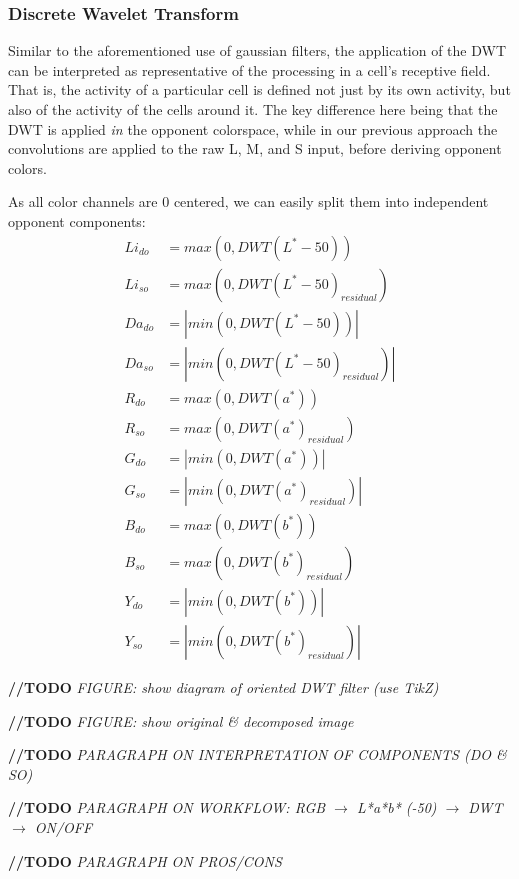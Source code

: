 \documentclass[journal,onecolumn]{IEEEtran}
\begin{document}
\subsubsection*{Discrete Wavelet Transform}
Similar to the aforementioned use of gaussian filters, the application of the DWT can be interpreted as representative of the processing in a cell's receptive field. That is, the activity of a particular cell is defined not just by its own activity, but also of the activity of the cells around it. The key difference here being that the DWT is applied \textit{in} the opponent colorspace, while in our previous approach the convolutions are applied to the raw L, M, and S input, before deriving opponent colors.

As all color channels are $0$ centered, we can easily split them into independent opponent components:
\begin{align}
    Li_{do} &=   max(0, DWT(L^*-50))              \\
    Li_{so} &=   max(0, DWT(L^*-50)_{residual})   \\
    Da_{do} &= | min(0, DWT(L^*-50)) |            \\
    Da_{so} &= | min(0, DWT(L^*-50)_{residual}) | \\
    R_{do}  &=   max(0, DWT(a^*))              \\
    R_{so}  &=   max(0, DWT(a^*)_{residual})   \\
    G_{do}  &= | min(0, DWT(a^*)) |            \\
    G_{so}  &= | min(0, DWT(a^*)_{residual}) | \\
    B_{do}  &=   max(0, DWT(b^*))              \\
    B_{so}  &=   max(0, DWT(b^*)_{residual})   \\
    Y_{do}  &= | min(0, DWT(b^*)) |            \\
    Y_{so}  &= | min(0, DWT(b^*)_{residual}) |
\end{align}

\textbf{//TODO} \textit{FIGURE: show diagram of oriented DWT filter (use TikZ)}

\textbf{//TODO} \textit{FIGURE: show original \& decomposed image}

\textbf{//TODO} \textit{PARAGRAPH ON INTERPRETATION OF COMPONENTS (DO \& SO)}

\textbf{//TODO} \textit{PARAGRAPH ON WORKFLOW: RGB $\rightarrow$ L*a*b* (-50) $\rightarrow$ DWT $\rightarrow$ ON/OFF}

\textbf{//TODO} \textit{PARAGRAPH ON PROS/CONS}
\end{document}

